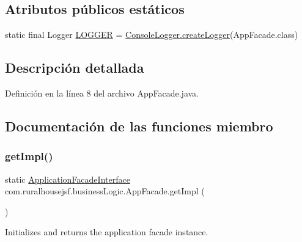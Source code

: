 \subsection*{Atributos públicos estáticos}
\begin{DoxyCompactItemize}
\item 
static final Logger \mbox{\hyperlink{classcom_1_1ruralhousejsf_1_1business_logic_1_1_app_facade_a05d4beab693581eccd0ba740dc222f37}{L\+O\+G\+G\+ER}} = \mbox{\hyperlink{classcom_1_1ruralhousejsf_1_1logger_1_1_console_logger_a520321643663e37d95761134a35505cd}{Console\+Logger.\+create\+Logger}}(App\+Facade.\+class)
\end{DoxyCompactItemize}


\subsection{Descripción detallada}


Definición en la línea 8 del archivo App\+Facade.\+java.



\subsection{Documentación de las funciones miembro}
\mbox{\label{classcom_1_1ruralhousejsf_1_1business_logic_1_1_app_facade_a029bcceee98b9070b9f80abc54db45d6}} 
\subsubsection{\texorpdfstring{getImpl()}{getImpl()}\hspace{0.1cm}{\footnotesize\ttfamily [1/3]}}
{\footnotesize\ttfamily static \mbox{\hyperlink{interfacecom_1_1ruralhousejsf_1_1business_logic_1_1_application_facade_interface}{Application\+Facade\+Interface}} com.\+ruralhousejsf.\+business\+Logic.\+App\+Facade.\+get\+Impl (\begin{DoxyParamCaption}{ }\end{DoxyParamCaption})\hspace{0.3cm}{\ttfamily [static]}}

Initializes and returns the application facade instance. 

